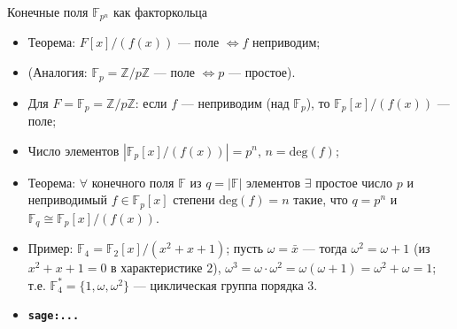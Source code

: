 \documentclass[serif, aspectratio=169]{beamer}
\newcommand{\sagemark}{%
  \textcolor{green!40!black}{\textbf{\texttt{sage:...}}}%
}
\begin{document}
\begin{frame}{Конечные поля $\mathbb{F}_{p^n}$ как факторкольца}
    \begin{itemize}
        \item Теорема: $F[x]/(f(x))$ --- поле $\Leftrightarrow f$ неприводим;
        \item (Аналогия: $\mathbb{F}_p=\mathbb{Z}/p\mathbb{Z}$ --- поле $\Leftrightarrow p$ --- простое).
        \item Для $F=\mathbb{F}_p=\mathbb{Z}/p\mathbb{Z}$: если $f$ --- неприводим (над $\mathbb{F}_p$), то $\mathbb{F}_p[x]/(f(x))$ --- поле;
        \item Число элементов $|\mathbb{F}_p[x]/(f(x))|=p^n$, $n=\mathrm{deg}(f)$;
        \item Теорема: $\forall$ конечного поля $\mathbb{F}$ из $q=|\mathbb{F}|$ элементов $\exists$ простое число $p$ и неприводимый $f\in\mathbb{F}_p[x]$ степени $\mathrm{deg}(f)=n$ такие, что $q=p^n$ и $\mathbb{F}_q\cong\mathbb{F}_p[x]/(f(x))$.
        \item Пример: $\mathbb{F}_4=\mathbb{F}_2[x]/(x^2+x+1)$; пусть $\omega=\bar x$ --- тогда $\omega^2=\omega+1$ (из $x^2+x+1=0$ в характеристике $2$), $\omega^3=\omega\cdot\omega^2=\omega(\omega+1)=\omega^2+\omega=1$; т.е. $\mathbb{F}_4^*=\{1,\omega,\omega^2\}$ --- циклическая группа порядка $3$.
        \item \sagemark
    \end{itemize}
\end{frame}
\end{document}
